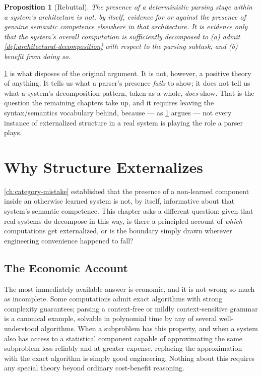 \documentclass[11pt]{book}
\theoremstyle{plain}
\newtheorem{proposition}[theorem]{Proposition}
\theoremstyle{definition}
\theoremstyle{remark}
\begin{document}
\begin{proposition}[Rebuttal]
\label{prop:rebuttal}
The presence of a deterministic parsing stage within a system's
architecture is not, by itself, evidence for or against the presence
of genuine semantic competence elsewhere in that architecture. It is
evidence only that the system's overall computation is
sufficiently decomposed to (a) admit \cref{def:architectural-decomposition}
with respect to the parsing subtask, and (b) benefit from doing so.
\end{proposition}

\cref{prop:rebuttal} is what disposes of the original argument. It is
not, however, a positive theory of anything. It tells us what a
parser's presence \emph{fails} to show; it does not tell us what a
system's decomposition pattern, taken as a whole, \emph{does} show.
That is the question the remaining chapters take up, and it requires
leaving the syntax/semantics vocabulary behind, because --- as
\cref{ch:why-structure-externalizes} argues --- not every instance of
externalized structure in a real system is playing the role a parser
plays.
\chapter{Why Structure Externalizes}
\label{ch:why-structure-externalizes}

\cref{ch:category-mistake} established that the presence of a
non-learned component inside an otherwise learned system is not, by
itself, informative about that system's semantic competence. This
chapter asks a different question: given that real systems do
decompose in this way, is there a principled account of \emph{which}
computations get externalized, or is the boundary simply drawn
wherever engineering convenience happened to fall?

\section{The Economic Account}

The most immediately available answer is economic, and it is not
wrong so much as incomplete. Some computations admit exact algorithms
with strong complexity guarantees; parsing a context-free or mildly
context-sensitive grammar is a canonical example, solvable in
polynomial time by any of several well-understood algorithms. When a
subproblem has this property, and when a system also has access to a
statistical component capable of approximating the same subproblem
less reliably and at greater expense, replacing the approximation with
the exact algorithm is simply good engineering. Nothing about this
requires any special theory beyond ordinary cost-benefit reasoning.
\end{document}
